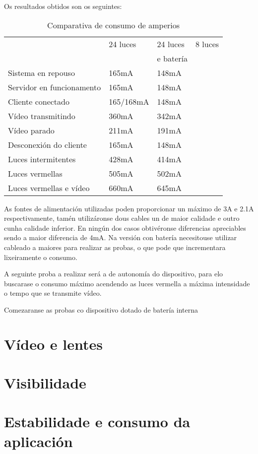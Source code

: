 Os resultados obtidos son os seguintes:

\begin{table}[tb]
    \label{c:comparativa}
    \begin{center}
        \begin{tabular}{|l|l|l|l|}
            \hline
             &  24 luces & 24 luces & 8 luces\\
             & & e batería & \\ \hline
             Sistema en repouso & 165mA & 148mA & \\ \hline
             Servidor en  funcionamento & 165mA & 148mA & \\ \hline
             Cliente conectado & 165/168mA  & 148mA & \\ \hline
             Vídeo transmitindo & 360mA & 342mA & \\ \hline
             Vídeo parado & 211mA & 191mA & \\ \hline
             Desconexión do cliente & 165mA & 148mA & \\ \hline
             Luces intermitentes & 428mA & 414mA & \\ \hline
             Luces vermellas & 505mA & 502mA & \\ \hline
             Luces vermellas e vídeo & 660mA & 645mA & \\ \hline
        \end{tabular}
    \end{center}
    \caption{Comparativa de consumo de amperios}
    \label{tab:my_label}
\end{table}


As fontes de alimentación utilizadas poden proporcionar un máximo de 3A e 2.1A respectivamente, tamén utilizáronse dous cables un de maior calidade e outro cunha calidade inferior. En ningún dos casos obtivéronse diferencias apreciables sendo a maior diferencia de 4mA. Na versión con batería necesitouse utilizar cableado a maiores para realizar as probas, o que pode que incrementara lixeiramente o consumo.

A seguinte proba a realizar será a de autonomía do dispositivo, para elo buscarase o consumo máximo acendendo as luces vermella a máxima intensidade o tempo que se transmite vídeo.

Comezaranse as probas co dispositivo dotado de batería interna 

\section{Vídeo e lentes}

\section{Visibilidade}

\section{Estabilidade e consumo da aplicación}
